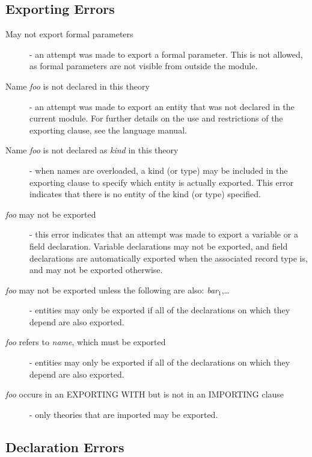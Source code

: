 \subsection{Exporting Errors}

\begin{description}

\item[May not export formal parameters] - an attempt was made to export a
formal parameter.  This is not allowed, as formal parameters are not
visible from outside the module.

\item[Name {\em foo\/} is not declared in this theory] - an attempt was
made to export an entity that was not declared in the current module.  For
further details on the use and restrictions of the exporting clause, see
the language manual.

\item[Name {\em foo\/} is not declared as {\em kind\/} in this theory] -
when names are overloaded, a kind (or type) may be included in the
exporting clause to specify which entity is actually exported.  This error
indicates that there is no entity of the kind (or type) specified.

\item[{\em foo\/} may not be exported] - this error indicates that an
attempt was made to export a variable or a field declaration.  Variable
declarations may not be exported, and field declarations are automatically
exported when the associated record type is, and may not be exported
otherwise.

\item[{\em foo\/} may not be exported unless the following are also: {\em
bar$_1$\/},\ldots] - entities may only be exported if all of the
declarations on which they depend are also exported.

\item[{\em foo\/} refers to {\em name\/}, which must be exported] -
entities may only be exported if all of the declarations on which they
depend are also exported.

\item[{\em foo\/} occurs in an EXPORTING WITH but is not in an IMPORTING
clause] - only theories that are imported may be exported.

\end{description}


\subsection{Declaration Errors}

